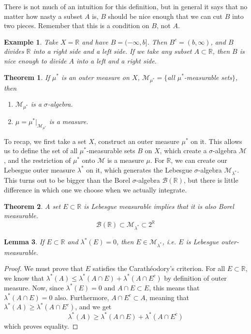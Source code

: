 \documentclass{article}
\newtheorem{theorem}{Theorem}[section]
\newtheorem{lemma}[theorem]{Lemma}
\newtheorem{example}{Example}[section]
\theoremstyle{remark}
\theoremstyle{definition}
\begin{document}
There is not much of an intuition for this definition, but in general it says that no matter how nasty a subset $A$ is, $B$ should be nice enough that we can cut $B$ into two pieces. Remember that this is a condition on $B$, not $A$. 

\begin{example}
Take $X = \mathbb{R}$ and have $B = (-\infty, b]$. Then $B^c = (b, \infty)$, and $B$ divides $\mathbb{R}$ into a right side and a left side. If we take any subset $A \subset \mathbb{R}$, then $B$ is nice enough to divide $A$ into a left and a right side. 
\end{example}

\begin{theorem}
If $\mu^*$ is an outer measure on $X$, $\mathcal{M}_{\mu^*} = \{$all $\mu^*$-measurable sets$\}$, then 
\begin{enumerate}
    \item $\mathcal{M}_{\mu^*}$ is a $\sigma$-algebra. 
    \item $\mu = \mu^* \big|_{\mathcal{M}_{\mu^*}}$ is a measure. 
\end{enumerate}
\end{theorem}

To recap, we first take a set $X$, construct an outer measure $\mu^*$ on it. This allows us to define the set of all $\mu^*$-measurable sets $B$ on $X$, which create a $\sigma$-algebra $\mathcal{M}$, and the restriction of $\mu^*$ onto $\mathcal{M}$ is a measure $\mu$. For $\mathbb{R}$, we can create our Lebesgue outer measure $\lambda^*$ on it, which generates the Lebesgue $\sigma$-algebra $\mathcal{M}_{\lambda^*}$. This turns out to be bigger than the Borel $\sigma$-algebra $\mathcal{B}(\mathbb{R})$, but there is little difference in which one we choose when we actually integrate. 

\begin{theorem}
A set $E \subset \mathbb{R}$ is Lebesgue measurable implies that it is also Borel measurable. 
\[\mathcal{B}(\mathbb{R}) \subset \mathcal{M}_{\lambda^*} \subset 2^\mathbb{R}\]
\end{theorem}

\begin{lemma}
If $E \subset \mathbb{R}$ and $\lambda^*(E) = 0$, then $E \in \mathcal{M}_{\lambda^*}$, i.e. $E$ is Lebesgue outer-measurable. 
\end{lemma}
\begin{proof}
We must prove that $E$ satisfies the Carathéodory's criterion. For all $E \subset \mathbb{R}$, we know that $\lambda^*(A) \leq \lambda^*(A \cap E) + \lambda^*(A \cap E^c)$ by definition of outer measure. Now, since $\lambda^* (E) =0$ and $A \cap E \subset E$, this means that $\lambda^* (A \cap E) = 0$ also. Furthermore, $A \cap E^c \subset A$, meaning that $\lambda^*(A) \geq \lambda^* (A \cap E^c)$, and we get 
\[\lambda^*(A) \geq \lambda^*(A \cap E) + \lambda^*(A \cap E^c)\]
which proves equality. 
\end{proof}
\end{document}
